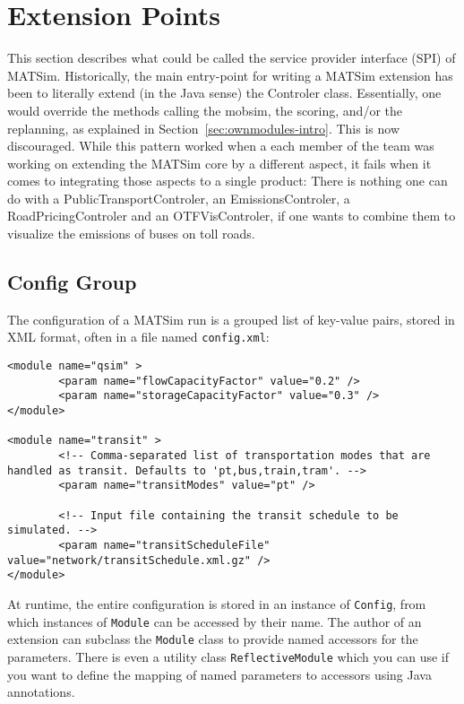 \section{Extension Points}
This section describes what could be called the service provider interface (SPI) of MATSim.
Historically, the main entry-point for writing a MATSim extension has been to literally extend (in the Java sense)
the Controler class.  Essentially, one would override the methods calling the mobsim, the scoring, and/or the replanning, as explained in Section~\ref{sec:ownmodules-intro}. This is now discouraged. While this pattern worked when a each member of the team
was working on extending the MATSim core by a different aspect, it fails when it comes to
integrating those aspects to a single product: There is nothing one can do with a PublicTransportControler, an EmissionsControler, a RoadPricingControler and an OTFVisControler,
if one wants to combine them to visualize the emissions of buses on toll roads.

\subsection{Config Group}
\label{sec:config}
The configuration of a MATSim run is a grouped list of key-value pairs, stored in XML
format, often in a file named \lstinline$config.xml$:
\begin{lstlisting}
<module name="qsim" >
		<param name="flowCapacityFactor" value="0.2" />
		<param name="storageCapacityFactor" value="0.3" />
</module>

<module name="transit" >
		<!-- Comma-separated list of transportation modes that are handled as transit. Defaults to 'pt,bus,train,tram'. -->
		<param name="transitModes" value="pt" />

		<!-- Input file containing the transit schedule to be simulated. -->
		<param name="transitScheduleFile" value="network/transitSchedule.xml.gz" />
</module>
\end{lstlisting}
At runtime, the entire configuration is stored in an instance of \lstinline$Config$, from which instances of \lstinline$Module$ can be accessed by their name.
The author of an extension can subclass the \lstinline$Module$ class to provide named accessors for the parameters.
There is even a utility class \lstinline$ReflectiveModule$ which you can use if you want to define the mapping of named parameters to accessors
using Java annotations.

